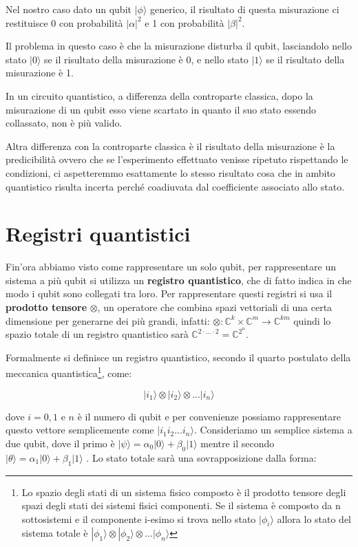 Nel nostro caso dato un qubit \(| \phi \rangle \) generico, il risultato di questa misurazione ci restituisce 0 con probabilità \( |\alpha|^2 \) e 1 con probabilità \( |\beta|^2 \).

Il problema in questo caso è che la misurazione disturba il qubit, lasciandolo nello stato \( | 0 \rangle \)  se il risultato della misurazione è 0, e nello stato \( | 1 \rangle \)  se il risultato della misurazione è 1.

In un circuito quantistico, a differenza della controparte classica, dopo la misurazione di un qubit esso viene scartato in quanto il suo stato essendo collassato, non è più valido.

Altra differenza con la controparte classica è il risultato della misurazione è la predicibilità ovvero che se l'esperimento effettuato venisse ripetuto rispettando le condizioni, ci aspetteremmo esattamente lo stesso risultato cosa che in ambito quantistico risulta incerta perché coadiuvata dal coefficiente associato allo stato.

\section{Registri quantistici}
Fin'ora abbiamo visto come rappresentare un solo qubit, per rappresentare un sistema a più qubit si utilizza un \textbf{registro quantistico}, che di fatto indica in che modo i qubit sono collegati tra loro. Per rappresentare questi registri si usa il \textbf{prodotto tensore} \( \otimes \), un operatore che combina spazi vettoriali di una certa dimensione per generarne dei più grandi, infatti: \( \otimes: \mathbb{C}^k \times \mathbb{C}^m \rightarrow \mathbb{C}^{km} \) quindi lo spazio totale di un registro quantistico sarà \( \mathbb{C}^{2 \cdot...\cdot 2} = \mathbb{C}^{2^n} \).

Formalmente si definisce un registro quantistico, secondo il quarto postulato della meccanica quantistica\footnote{Lo spazio degli stati di un sistema fisico composto è il prodotto tensore degli spazi degli stati dei sistemi fisici componenti. Se il sistema è composto da n sottosistemi e il componente i-esimo si trova nello stato \( | \phi _i \rangle \) allora lo stato del sistema totale è \( | \phi _1 \rangle \otimes | \phi _2 \rangle \otimes ... | \phi _n \rangle \)}, come:

\[
  | i _1 \rangle \otimes | i _2 \rangle \otimes ... | i _n \rangle
\]

dove \(i = 0,1\) e \(n\) è il numero di qubit e per convenienze possiamo rappresentare questo vettore semplicemente come \( | i _1 i _2 ... i _n \rangle \). Consideriamo un semplice sistema a due qubit, dove il primo è \( |\psi \rangle  = \alpha _0 |0 \rangle  + \beta _0 |1 \rangle \)  mentre il secondo \( |\theta \rangle  = \alpha _1 | 0 \rangle  + \beta _1 | 1 \rangle \) . Lo stato totale sarà una sovrapposizione dalla forma:

